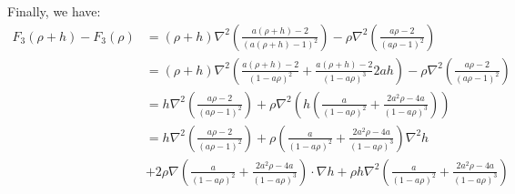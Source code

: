 \documentclass[11pt, a4paper]{article}
\theoremstyle{definition}
\begin{document}
Finally, we have:
\begin{align*}
	F_3(\rho+h) - F_3(\rho) &= (\rho +h) \nabla^2 \left(\frac{a(\rho +h) -2}{(a(\rho +h) -1)^2}\right) -\rho \nabla^2 \left(\frac{a\rho -2}{(a\rho -1)^2}\right)\\
	&=  (\rho +h) \nabla^2 \left(\frac{a(\rho +h) -2}{(1-a\rho)^2} + \frac{a(\rho +h) -2}{(1-a\rho)^3}2ah \right) -\rho \nabla^2 \left(\frac{a\rho -2}{(a\rho -1)^2}\right)\\
	&= h \nabla^2 \left(\frac{a\rho -2}{(a\rho -1)^2}\right) + \rho \nabla^2  \left(h\left(\frac{a }{(1-a\rho)^2} + \frac{2a^2\rho -4a}{(1-a\rho)^3} \right)\right)\\
	&= h \nabla^2 \left(\frac{a\rho -2}{(a\rho -1)^2}\right) + \rho  \left(\frac{a }{(1-a\rho)^2} + \frac{2a^2\rho -4a}{(1-a\rho)^3} \right)\nabla^2 h \\
	&+ 2 \rho \nabla \left(\frac{a }{(1-a\rho)^2} + \frac{2a^2\rho -4a}{(1-a\rho)^3} \right) \cdot \nabla h + \rho h \nabla^2  \left(\frac{a }{(1-a\rho)^2} + \frac{2a^2\rho -4a}{(1-a\rho)^3} \right)\\
\end{align*}
\end{document}
